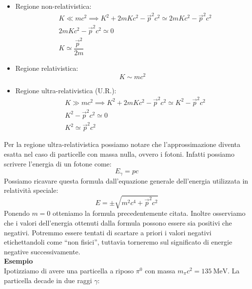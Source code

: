 \begin{itemize}
    \item Regione non-relativistica:
    \begin{equation}
        \begin{split}
            &K \ll mc^2 \implies K^2 + 2mKc^2 - \vec{p}^2c^2 \simeq 2mKc^2 - \vec{p}^2c^2 \\[8pt]
            &2mKc^2 - \vec{p}^2c^2 \simeq 0 \\[8pt]
            &K \simeq \dfrac{\vec{p}^2}{2m}
        \end{split}
    \end{equation}
    \item Regione relativistica:
    \begin{equation}
        K \sim mc^2
    \end{equation}
    \item Regione ultra-relativistica (U.R.):
    \begin{equation}
        \begin{split}
            &K \gg mc^2 \implies K^2 + 2mKc^2 - \vec{p}^2c^2 \simeq K^2 - \vec{p}^2c^2 \\[8pt]
            &K^2 - \vec{p}^2c^2 \simeq 0 \\[8pt]
            &K^2 \simeq \vec{p}^2c^2
        \end{split}
    \end{equation}
\end{itemize}
Per la regione ultra-relativistica possiamo notare che l'approssimazione diventa esatta nel caso di particelle con massa nulla, ovvero i fotoni. Infatti possiamo scrivere l'energia di un fotone come:
\begin{equation}
    E_\gamma = pc
\end{equation}
Possiamo ricavare questa formula dall'equazione generale dell'energia utilizzata in relatività speciale:
\begin{equation}
    E = \pm \sqrt{m^2c^4 + \vec{p}^2c^2}
\end{equation}
Ponendo $m = 0$ otteniamo la formula precedentemente citata. Inoltre osserviamo che i valori dell'energia ottenuti dalla formula possono essere sia positivi che negativi. Potremmo essere tentati di scartare a priori i valori negativi etichettandoli come ``non fisici'', tuttavia torneremo sul significato di energie negative successivamente.\\
\textbf{Esempio}\\
Ipotizziamo di avere una particella a riposo $\pi^0$ con massa $m_\pi c^2= \qty{135}{\mega\electronvolt}$. La particella decade in due raggi $\gamma$:
